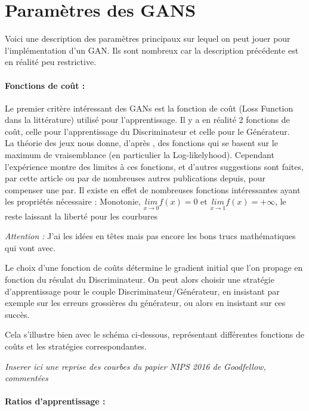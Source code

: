 \section{Paramètres des GANS}

	Voici une description des paramètres principaux sur lequel on peut jouer pour l'implémentation d'un GAN. Ils sont nombreux car la description précédente est en réalité peu restrictive.

	\paragraph*{Fonctions de coût : } 
		Le premier critère intéressant des GANs est la fonction de coût (Loss Function dans la littérature) utilisé pour l'apprentissage. Il y a en réalité 2 fonctions de coût, celle pour l'apprentissage du Discriminateur et celle pour le Générateur. \\
		La théorie des jeux nous donne, d'après \cite{Goodfellow-et-al-2016}, des fonctions qui se basent sur le maximum de vraisemblance (en particulier la Log-likelyhood). Cependant l'expérience montre des limites à ces fonctions, et d'autres suggestions sont faites, par cette article ou par de nombreuses autres publications depuis, pour compenser une par. Il existe en effet de nombreuses fonctions intéressantes ayant les propriétés nécessaire : Monotonie, $\underset{x\rightarrow0}{lim} f(x) = 0 \text{ et } \underset{x\rightarrow 1}{lim} f(x) = +\infty$, le reste laissant la liberté pour les courbures

		\emph{Attention : } J'ai les idées en têtes mais pas encore les bons trucs mathématiques qui vont avec.  

		Le choix d'une fonction de coûts détermine le gradient initial que l'on propage en fonction du résulat du Discriminateur. On peut alors choisir une stratégie d'apprentissage pour le couple Discriminateur/Générateur, en insistant par exemple sur les erreurs grossières du générateur, ou alors en insistant sur ces succès.

		Cela s'illustre bien avec le schéma ci-dessous, représentant différentes fonctions de coûts et les stratégies correspondantes.

		\emph{Inserer ici une reprise des courbes du papier NIPS 2016 de Goodfellow, commentées}

	\paragraph*{Ratios d'apprentissage : } 

